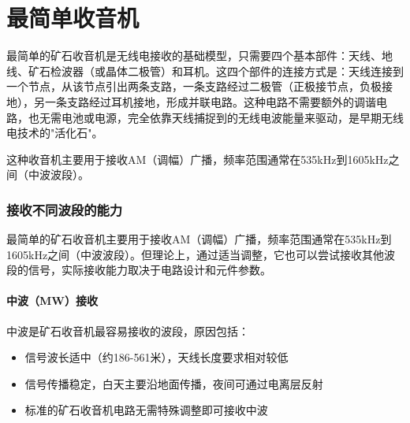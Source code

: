 \documentclass[12pt,UTF8]{ctexbook}
\begin{document}
\chapter{最简单收音机}

最简单的矿石收音机是无线电接收的基础模型，只需要四个基本部件：天线、地线、矿石检波器（或晶体二极管）和耳机。这四个部件的连接方式是：天线连接到一个节点，从该节点引出两条支路，一条支路经过二极管（正极接节点，负极接地），另一条支路经过耳机接地，形成并联电路。这种电路不需要额外的调谐电路，也无需电池或电源，完全依靠天线捕捉到的无线电波能量来驱动，是早期无线电技术的"活化石"。

这种收音机主要用于接收AM（调幅）广播，频率范围通常在535kHz到1605kHz之间（中波波段）。

\subsection{接收不同波段的能力}

最简单的矿石收音机主要用于接收AM（调幅）广播，频率范围通常在535kHz到1605kHz之间（中波波段）。但理论上，通过适当调整，它也可以尝试接收其他波段的信号，实际接收能力取决于电路设计和元件参数。

\subsubsection{中波（MW）接收}
中波是矿石收音机最容易接收的波段，原因包括：
\begin{itemize}[leftmargin=3.5em]
    \item 信号波长适中（约186-561米），天线长度要求相对较低
    \item 信号传播稳定，白天主要沿地面传播，夜间可通过电离层反射
    \item 标准的矿石收音机电路无需特殊调整即可接收中波
\end{itemize}
\end{document}

